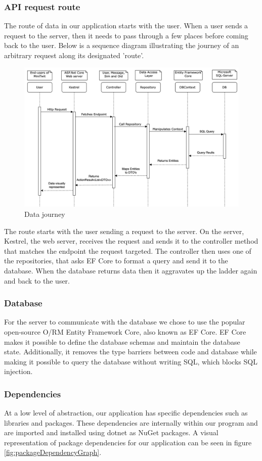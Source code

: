 \subsubsection{API request route}
The route of data in our application starts with the user. When a user sends a request to the server, then it needs to pass through a few places before coming back to the user. Below is a sequence diagram illustrating the journey of an arbitrary request along its designated 'route'.

\vspace{3pt}
\begin{figure}[H]
    \centering
    \includegraphics[width=0.65\linewidth]{Report/Images/SequenceDevOps.jpg} 
    \caption{Data journey}
    \label{fig:API_Sequence}
\end{figure}
\vspace{3pt}

The route starts with the user sending a request to the server. On the server, Kestrel, the web server, receives the request and sends it to the controller method that matches the endpoint the request targeted. The controller then uses one of the repositories, that asks EF Core to format a query and send it to the database. When the database returns data then it aggravates up the ladder again and back to the user.

\subsubsection{Database}
\noindent For the server to communicate with the database we chose to use the popular open-source O/RM Entity Framework Core, also known as EF Core. EF Core makes it possible to define the database schemas and maintain the database state. Additionally, it removes the type barriers between code and database while making it possible to query the database without writing SQL, which blocks SQL injection.

\subsubsection{Dependencies}
At a low level of abstraction, our application has specific dependencies such as libraries and packages. These dependencies are internally within our program and are imported and installed using dotnet as NuGet packages. A visual representation of package dependencies for our application can be seen in figure \ref{fig:packageDependencyGraph}. 

